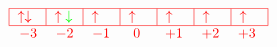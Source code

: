 \[
    \textcolor{red}{
        \begin{array}{c}
            \begin{tabular}{|m{0.5cm}|m{0.5cm}|m{0.5cm}|m{0.5cm}|m{0.5cm}|m{0.5cm}|m{0.5cm}|}
                \hline
                $\uparrow \downarrow$ & $\uparrow \textcolor{green}{\downarrow}$ & $\uparrow$ & $\uparrow$ & $\uparrow$ & $\uparrow$ & $\uparrow$ \\
                \hline
            \end{tabular} \\
            \begin{tabular}{m{0.5cm} m{0.5cm} m{0.5cm} m{0.5cm} m{0.5cm} m{0.5cm} m{0.5cm}}
                $-3$ & $-2$ & $-1$ & \text{ 0 } & $+1$ & $+2$ & $+3$
            \end{tabular}
        \end{array}
    }
\]
